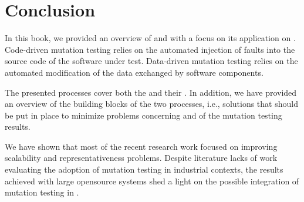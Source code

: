 
\chapter{Conclusion}
\label{chapter:conclusion}


In this book, we provided an overview of  and   with a focus on its application on . Code-driven mutation testing relies on the automated injection of faults into the source code of the software under test. Data-driven mutation testing relies on the automated modification of the data exchanged by software components.

The presented processes cover both the  and their . In addition, we have provided an overview of the building blocks of the two processes, i.e., solutions that should be put in place to minimize problems concerning  and  of the mutation testing results.

We have shown that most of the recent research work focused on improving scalability and representativeness problems. Despite literature lacks of work evaluating the adoption of mutation testing in industrial contexts, the results achieved with large opensource systems shed a light on the possible integration of mutation testing in .

